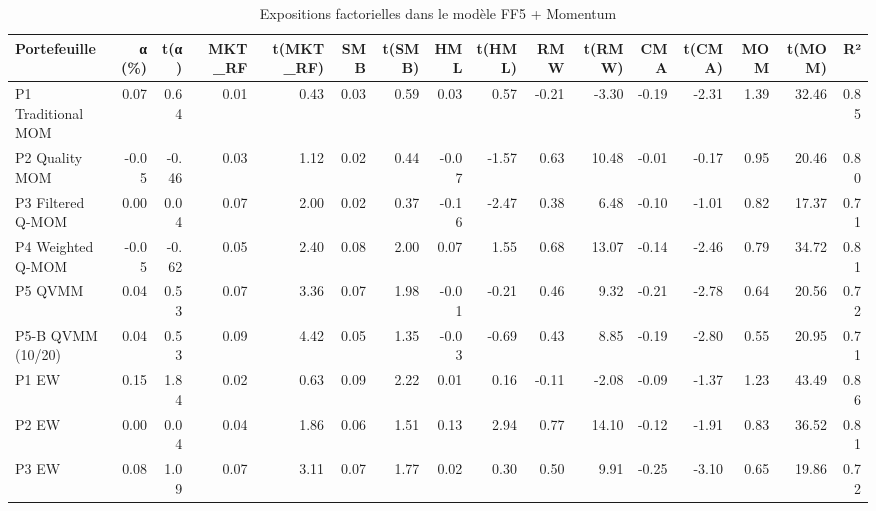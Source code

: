 \begin{table}[htbp]
\centering
\small
\caption{Expositions factorielles dans le modèle FF5 + Momentum}
\label{tab:T6b_expositions_FF5MOM}
\begin{tabular}{lrrrrrrrrrrrrrrr}
\toprule
Portefeuille & α (\%) & t(α) & MKT\_RF & t(MKT\_RF) & SMB & t(SMB) & HML & t(HML) & RMW & t(RMW) & CMA & t(CMA) & MOM & t(MOM) & R² \\
\midrule
P1 Traditional MOM & 0.07 & 0.64 & 0.01 & 0.43 & 0.03 & 0.59 & 0.03 & 0.57 & -0.21 & -3.30 & -0.19 & -2.31 & 1.39 & 32.46 & 0.85 \\
P2 Quality MOM & -0.05 & -0.46 & 0.03 & 1.12 & 0.02 & 0.44 & -0.07 & -1.57 & 0.63 & 10.48 & -0.01 & -0.17 & 0.95 & 20.46 & 0.80 \\
P3 Filtered Q-MOM & 0.00 & 0.04 & 0.07 & 2.00 & 0.02 & 0.37 & -0.16 & -2.47 & 0.38 & 6.48 & -0.10 & -1.01 & 0.82 & 17.37 & 0.71 \\
P4 Weighted Q-MOM & -0.05 & -0.62 & 0.05 & 2.40 & 0.08 & 2.00 & 0.07 & 1.55 & 0.68 & 13.07 & -0.14 & -2.46 & 0.79 & 34.72 & 0.81 \\
P5 QVMM & 0.04 & 0.53 & 0.07 & 3.36 & 0.07 & 1.98 & -0.01 & -0.21 & 0.46 & 9.32 & -0.21 & -2.78 & 0.64 & 20.56 & 0.72 \\
P5-B QVMM (10/20) & 0.04 & 0.53 & 0.09 & 4.42 & 0.05 & 1.35 & -0.03 & -0.69 & 0.43 & 8.85 & -0.19 & -2.80 & 0.55 & 20.95 & 0.71 \\
P1 EW & 0.15 & 1.84 & 0.02 & 0.63 & 0.09 & 2.22 & 0.01 & 0.16 & -0.11 & -2.08 & -0.09 & -1.37 & 1.23 & 43.49 & 0.86 \\
P2 EW & 0.00 & 0.04 & 0.04 & 1.86 & 0.06 & 1.51 & 0.13 & 2.94 & 0.77 & 14.10 & -0.12 & -1.91 & 0.83 & 36.52 & 0.81 \\
P3 EW & 0.08 & 1.09 & 0.07 & 3.11 & 0.07 & 1.77 & 0.02 & 0.30 & 0.50 & 9.91 & -0.25 & -3.10 & 0.65 & 19.86 & 0.72 \\
\bottomrule
\end{tabular}
\end{table}